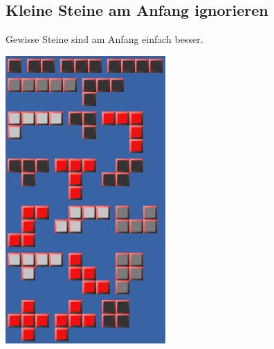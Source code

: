 \documentclass[12pt]{beamer}
\begin{document}
\subsection{Kleine Steine am Anfang ignorieren}
\begin{frame}
	Gewisse Steine sind am Anfang einfach besser.\\
	\pause
	\begin{center}
		\includegraphics[width=0.4\linewidth]{media/opt1.png}
	\end{center}
\end{frame}
\end{document}
